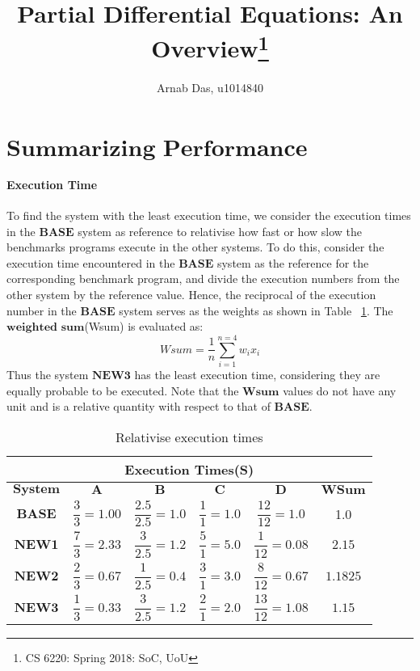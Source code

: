 \documentclass{tufte-handout}
\title{Partial Differential Equations: An Overview\thanks{CS 6220: Spring 2018: SoC, UoU}}
\author[]{Arnab Das, u1014840}
\begin{document}
  
  \maketitle%
  

 \setcounter{secnumdepth}{1}


\section{$\textbf{Summarizing Performance Numbers}$}
	 \paragraph{Execution Time} To find the system with the least execution time, we consider the execution times in the $\textbf{BASE}$ system as reference to relativise how fast or how slow the benchmarks programs execute in the other systems. To do this, consider the execution time encountered in the $\textbf{BASE}$ system as the reference for the corresponding benchmark program, and divide the execution numbers from the other system by the reference value. Hence, the reciprocal of the execution number in the $\textbf{BASE}$ system serves as the weights as shown in Table ~\ref{tab:exec-time}. The $\textbf{weighted sum}$(Wsum) is evaluated as:
		\[ Wsum = \dfrac{1}{n} \sum_{i=1}^{n=4} w_i x_i\]
	Thus the system $\textbf{NEW3}$ has the least execution  time, considering they are equally probable to be executed. Note that the $\textbf{Wsum}$ values do not have any unit and is a relative quantity with respect to that of $\textbf{BASE}$.

	\begin{table}[!h]
	    \centering
	    \selectfont
		\renewcommand{\arraystretch}{3.0}
		\label{tab:exec-time}
	    \begin{tabular}{c|c|c|c|c|c}
	      \toprule
		  \multicolumn{6}{|c|}{Execution Times(S)}  \\
	      \midrule 
		  $\textbf{System}$ & $\textbf{A}$ & $\textbf{B}$ & $\textbf{C}$ & $\textbf{D}$ & $\textbf{WSum}$ \\  %
		  $\textbf{BASE}$ & $\dfrac{3}{3}=1.00$ & $\dfrac{2.5}{2.5}=1.0$ & $\dfrac{1}{1} = 1.0$ & $\dfrac{12}{12} = 1.0$ & 1.0 \\ 
		  $\textbf{NEW1}$ & $\dfrac{7}{3}=2.33$ & $\dfrac{3}{2.5} = 1.2$ & $\dfrac{5}{1} = 5.0$ & $\dfrac{1}{12} = 0.08$ & $2.15$ \\ 
		  $\textbf{NEW2}$ & $\dfrac{2}{3}=0.67$ & $\dfrac{1}{2.5} = 0.4$ & $\dfrac{3}{1} = 3.0$ & $\dfrac{8}{12} = 0.67$ & $1.1825$ \\ 
		  $\textbf{NEW3}$ & $\dfrac{1}{3}=0.33$ & $\dfrac{3}{2.5} = 1.2$ & $\dfrac{2}{1} = 2.0$ & $\dfrac{13}{12} = 1.08$ & $1.15$ \\
	      \bottomrule
	    \end{tabular}
	    \caption{ Relativise execution times }
	  \end{table}
\end{document}

